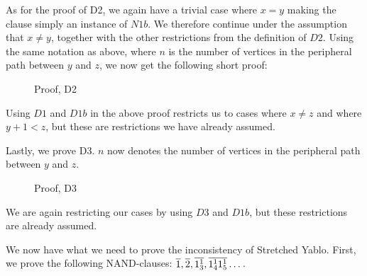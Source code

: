As for the proof of D2, we again have a trivial case where $x = y$ making the clause simply an instance of $N1b$.
We therefore continue under the assumption that $x \neq y$, together with the other restrictions from the definition of $D2$.
Using the same notation as above, where $n$ is the number of vertices in the peripheral path between $y$ and $z$, we now get the following short proof:\par
\begin{figure}[!h]
  \centering
  \begin{prooftree*}
  \end{prooftree*}
  \caption{Proof, D2}
  \label{fig:proof_d2}
\end{figure}
\FloatBarrier
Using $D1$ and $D1b$ in the above proof restricts us to cases where $x \neq z$ and where $y+1 < z$, but these are restrictions we have already assumed.

Lastly, we prove D3.
$n$ now denotes the number of vertices in the peripheral path between $y$ and $z$.\par
\begin{figure}[!h]
  \centering
  \begin{prooftree*}
  \end{prooftree*}
  \caption{Proof, D3}
  \label{fig:proof_d3}
\end{figure}
\FloatBarrier
We are again restricting our cases by using $D3$ and $D1b$, but these restrictions are already assumed.

We now have what we need to prove the inconsistency of Stretched Yablo.
First, we prove the following NAND-clauses: $\ol{1},\ol{2},\ol{1^1_3},\ol{1^1_4}\ol{1^1_5}\dots$.

